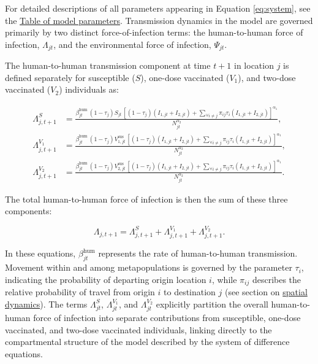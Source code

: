 \documentclass[
]{book}
\begin{document}
For detailed descriptions of all parameters appearing in Equation \eqref{eq:system}, see the \hyperref[parameters-table]{Table of model parameters}. Transmission dynamics in the model are governed primarily by two distinct force-of-infection terms: the human-to-human force of infection, \(\Lambda_{jt}\), and the environmental force of infection, \(\Psi_{jt}\).

The human-to-human transmission component at time \(t+1\) in location \(j\) is defined separately for susceptible (\(S\)), one-dose vaccinated (\(V_1\)), and two-dose vaccinated (\(V_2\)) individuals as:

\begin{equation}
\begin{aligned}
\Lambda^S_{j,t+1} &= \frac{
\beta_{jt}^{\text{hum}} \, (1-\tau_{j})S_{jt} \, \left[ (1-\tau_{j}) (I_{1,jt} + I_{2,jt}) + \sum_{\forall i \neq j} \pi_{ij}\tau_i(I_{1,jt} + I_{2,jt}) \right]^{\alpha_1}}{N_{jt}^{\alpha_2}},\\[4mm]
\Lambda^{V_1}_{j,t+1} &= \frac{
\beta_{jt}^{\text{hum}} \, (1-\tau_{j})V^{\text{sus}}_{1,jt}  \, \left[ (1-\tau_{j})(I_{1,jt} + I_{2,jt}) + \sum_{\forall i \neq j} \pi_{ij}\tau_i(I_{1,jt} + I_{2,jt}) \right]^{\alpha_1}}{N_{jt}^{\alpha_2}},\\[4mm]
\Lambda^{V_2}_{j,t+1} &= \frac{
\beta_{jt}^{\text{hum}} \, (1-\tau_{j})V^{\text{sus}}_{2,jt} \, \left[ (1-\tau_{j})(I_{1,jt} + I_{2,jt}) + \sum_{\forall i \neq j} \pi_{ij}\tau_i(I_{1,jt} + I_{2,jt}) \right]^{\alpha_1}}{N_{jt}^{\alpha_2}}.
\end{aligned}
\label{eq:foi-human}
\end{equation}

The total human-to-human force of infection is then the sum of these three components:

\begin{equation}
\Lambda_{j,t+1} =  \Lambda^S_{j,t+1} + \Lambda^{V_1}_{j,t+1} + \Lambda^{V_2}_{j,t+1}.
\label{eq:foi-human-total}
\end{equation}

In these equations, \(\beta_{jt}^{\text{hum}}\) represents the rate of human-to-human transmission. Movement within and among metapopulations is governed by the parameter \(\tau_i\), indicating the probability of departing origin location \(i\), while \(\pi_{ij}\) describes the relative probability of travel from origin \(i\) to destination \(j\) (see section on \hyperref[spatial-dynamics]{spatial dynamics}). The terms \(\Lambda^{S}_{jt}\), \(\Lambda^{V_1}_{jt}\), and \(\Lambda^{V_2}_{jt}\) explicitly partition the overall human-to-human force of infection into separate contributions from susceptible, one-dose vaccinated, and two-dose vaccinated individuals, linking directly to the compartmental structure of the model described by the system of difference equations.
\end{document}
